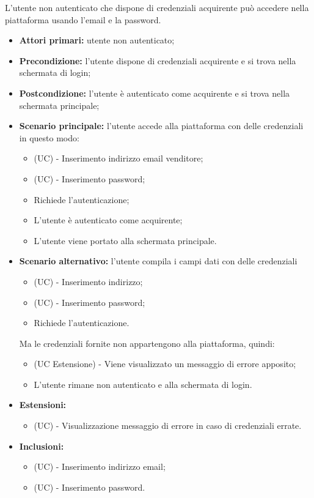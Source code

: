 L'utente non autenticato che dispone di credenziali acquirente può accedere nella piattaforma usando l'email e la password.
\begin{itemize}
	\item \textbf{Attori primari:} utente non autenticato;
	\item \textbf{Precondizione:} l'utente dispone di credenziali acquirente e si trova nella schermata di login;
	\item \textbf{Postcondizione:} l'utente è autenticato come acquirente e si trova nella schermata principale;
	\item \textbf{Scenario principale:} l'utente accede alla piattaforma con delle credenziali in questo modo:
	\begin{itemize}
		\item (UC) - Inserimento indirizzo email venditore;
		\item (UC) - Inserimento password;
		\item Richiede l'autenticazione;
		\item L'utente è autenticato come acquirente;
		\item L'utente viene portato alla schermata principale.
	\end{itemize}
	\item \textbf{Scenario alternativo:} l'utente compila i campi dati con delle credenziali
	\begin{itemize}
		\item (UC) - Inserimento indirizzo;
		\item (UC) - Inserimento password;
		\item Richiede l'autenticazione.
	\end{itemize}
	Ma le credenziali fornite non appartengono alla piattaforma, quindi:
	\begin{itemize}
		\item (UC Estensione) - Viene visualizzato un messaggio di errore apposito;
		\item L'utente rimane non autenticato e alla schermata di login.
	\end{itemize}
	\item \textbf{Estensioni:}
	\begin{itemize}
		\item (UC) - Visualizzazione messaggio di errore in caso di credenziali errate.
	\end{itemize}
	\item \textbf{Inclusioni:}
	\begin{itemize}
		\item (UC) - Inserimento indirizzo email;
		\item (UC) - Inserimento  password. 
		\end{itemize}
\end{itemize}

